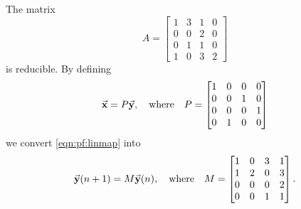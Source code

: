 \begin{xexample}
The matrix 
\begin{equation}
  A = \begin{bmatrix}
            1 & 3 & 1 & 0 \\
            0 & 0 & 2 & 0 \\
            0 & 1 & 1 & 0 \\
            1 & 0 & 3 & 2
      \end{bmatrix}
\label{eqn:examplereducible}
\end{equation}
is reducible.  By defining
\begin{equation}
   \vec{\textbf{x}} = P\vec{\textbf{y}}, \quad \textrm{where}\quad
   P = \begin{bmatrix}
          1 & 0 & 0 & 0 \\
          0 & 0 & 1 & 0 \\
          0 & 0 & 0 & 1 \\
          0 & 1 & 0 & 0
       \end{bmatrix}
\end{equation}
we convert \eqref{eqn:pf:linmap} into
\begin{equation}
   \vec{\textbf{y}}(n+1) = M\vec{\textbf{y}}(n), \quad \textrm{where} \quad
   M = \begin{bmatrix}
         1 & 0 & 3 & 1 \\
         1 & 2 & 0 & 3 \\
         0 & 0 & 0 & 2 \\
         0 & 0 & 1 & 1
       \end{bmatrix}.
\end{equation}
\end{xexample}

